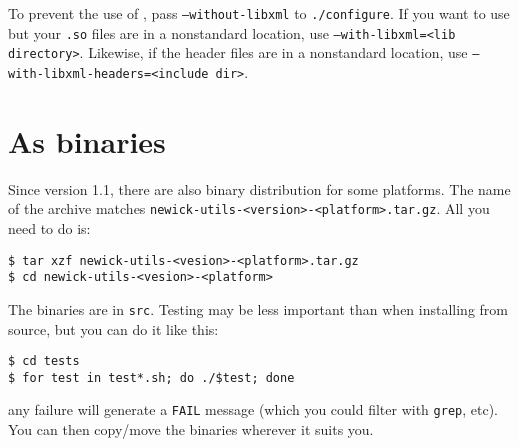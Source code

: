 \noindent{}To prevent the use of \libxml, pass \texttt{--without-libxml} to
\texttt{./configure}. If you want to use \libxml{} but your \texttt{.so} files
are in a nonstandard location, use \texttt{--with-libxml=<lib directory>}.
Likewise, if the \libxml{} header files are in a nonstandard location, use
\texttt{--with-libxml-headers=<include dir>}.

\section{As binaries}

Since version 1.1, there are also binary distribution for some platforms. The
name of the archive matches \texttt{newick-utils-<version>-<platform>.tar.gz}.
All you need to do is:

\begin{verbatim}
$ tar xzf newick-utils-<vesion>-<platform>.tar.gz
$ cd newick-utils-<vesion>-<platform>
\end{verbatim}

\noindent{}The binaries are in \texttt{src}. Testing may be less important than
when installing from source, but you can do it like this:

\begin{verbatim}
$ cd tests
$ for test in test*.sh; do ./$test; done 
\end{verbatim}

\noindent{}any failure will generate a \texttt{FAIL} message (which you could filter with \texttt{grep}, etc).  You can then copy/move the binaries wherever it suits you.

